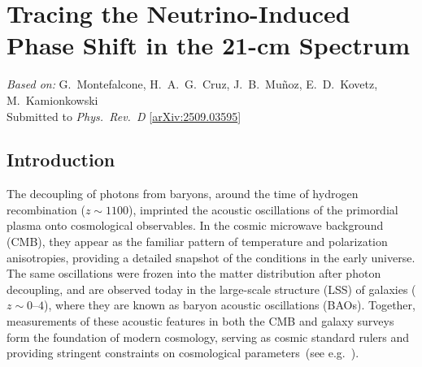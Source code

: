 \chapter{Tracing the Neutrino-Induced Phase Shift in the 21-cm Spectrum}
\label{ch:neutrino-21cm}

\begin{center}
\textit{Based on:} G.~Montefalcone, H.~A.~G.~Cruz, J.~B.~Mu\~noz, E.~D.~Kovetz, M.~Kamionkowski\\
Submitted to \textit{Phys.\ Rev.\ D}
[\href{https://arxiv.org/abs/2509.03595}{arXiv:2509.03595}]
\end{center}
\vspace{1em}


\renewcommand{\GM}[1]{}


\section{Introduction}

\noindent The decoupling of photons from baryons, around the time of hydrogen recombination ($z\sim 1100$), imprinted the acoustic oscillations of the primordial plasma onto cosmological observables. In the cosmic microwave background (CMB), they appear as the familiar pattern of temperature and polarization anisotropies, providing a detailed snapshot of the conditions in the early universe. The same oscillations were frozen into the matter distribution after photon decoupling, and are observed today in the large-scale  structure (LSS) of galaxies ($z\sim0$--$4$), where they are known as baryon acoustic oscillations (BAOs). Together, measurements of these acoustic features in both
the CMB and galaxy surveys form the foundation of modern cosmology, serving as cosmic standard rulers and providing stringent constraints on cosmological parameters~(see e.g.~\cite{Annis:2022xgg, Chang:2022lrw}).

